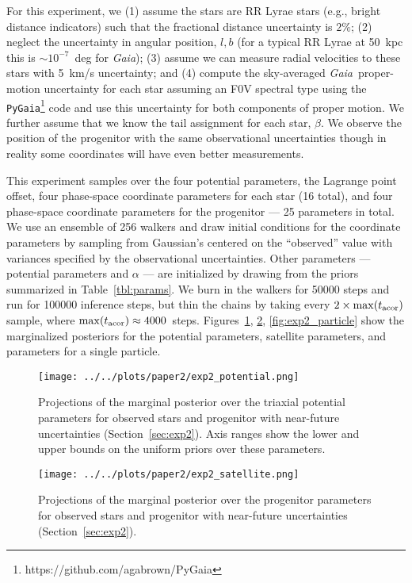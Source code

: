 \documentclass[letterpaper,12pt,preprint]{aastex}
\newcommand{\project}[1]{\textsl{#1}}
\newcommand{\gaia}{\project{Gaia}}
\newcommand{\Loffset}{\alpha}
\begin{document}
For this experiment, we (1) assume the stars are RR Lyrae stars (e.g., bright distance indicators) such that the fractional distance uncertainty is $2\%$; (2) neglect the uncertainty in angular position, $l,b$ (for a typical RR Lyrae at 50~kpc this is $\sim$$10^{-7}$~deg for \gaia); (3) assume we can measure radial velocities to these stars with 5~km/s uncertainty; and (4) compute the sky-averaged \gaia\, proper-motion uncertainty for each star assuming an F0V spectral type using the \texttt{PyGaia}\footnote{https://github.com/agabrown/PyGaia} code and use this uncertainty for both components of proper motion. We further assume that we know the tail assignment for each star, $\beta$. We observe the position of the progenitor with the same observational uncertainties though in reality some coordinates will have even better measurements.

This experiment samples over the four potential parameters, the Lagrange point offset, four phase-space coordinate parameters for each star (16 total), and four phase-space coordinate parameters for the progenitor --- 25 parameters in total. We use an ensemble of 256 walkers and draw initial conditions for the coordinate parameters by sampling from Gaussian's centered on the ``observed'' value with variances specified by the observational uncertainties. Other parameters --- potential parameters and $\Loffset$ --- are initialized by drawing from the priors summarized in Table~\ref{tbl:params}. We burn in the walkers for 50000 steps and run for 100000 inference steps, but thin the chains by taking every $2\times \max(t_{\rm acor})$ sample, where $\max(t_{\rm acor}) \approx 4000$~steps. Figures~\ref{fig:exp2_potential}, \ref{fig:exp2_satellite}, \ref{fig:exp2_particle} show the marginalized posteriors for the potential parameters, satellite parameters, and parameters for a single particle. 

\begin{figure}[!ht]
\begin{center}
\texttt{[image: ../../plots/paper2/exp2\_potential.png]}
\caption{ Projections of the marginal posterior over the triaxial potential parameters for observed stars and progenitor with near-future uncertainties (Section~\ref{sec:exp2}). Axis ranges show the lower and upper bounds on the uniform priors over these parameters. }\label{fig:exp2_potential}
\end{center}
\end{figure}

\begin{figure}[!ht]
\begin{center}
\texttt{[image: ../../plots/paper2/exp2\_satellite.png]}
\caption{ Projections of the marginal posterior over the progenitor parameters for observed stars and progenitor with near-future uncertainties (Section~\ref{sec:exp2}). }\label{fig:exp2_satellite}
\end{center}
\end{figure}
\end{document}
